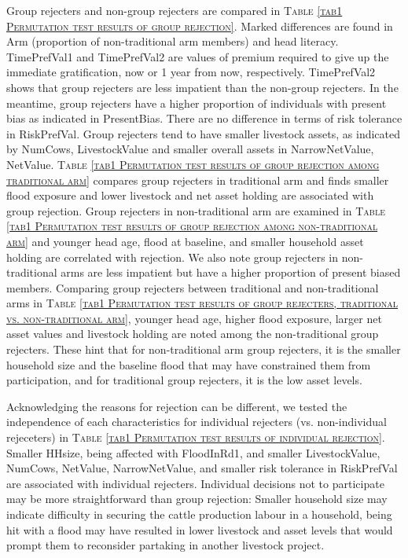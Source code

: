 	Group rejecters and non-group rejecters are compared in \textsc{\normalsize Table \ref{tab1 Permutation test results of group rejection}}. Marked differences are found in \textsf{Arm} (proportion of non-\textsf{traditional} arm members) and head literacy. \textsf{TimePrefVal1} and \textsf{TimePrefVal2} are values of premium required to give up the immediate gratification, now or 1 year from now, respectively. \textsf{TimePrefVal2} shows that group rejecters are less impatient than the non-group rejecters. In the meantime, group rejecters have a higher proportion of individuals with present bias as indicated in \textsf{PresentBias}. There are no difference in terms of risk tolerance in \textsf{RiskPrefVal}. Group rejecters tend to have smaller livestock assets, as indicated by \textsf{NumCows, LivestockValue} and smaller overall assets in \textsf{NarrowNetValue, NetValue}. 
	\textsc{\normalsize Table \ref{tab1 Permutation test results of group rejection among traditional arm}} compares group rejecters in \textsf{traditional} arm and finds smaller flood exposure and lower livestock and net asset holding are associated with group rejection. Group rejecters in non-\textsf{traditional} arm are examined in \textsc{\normalsize Table \ref{tab1 Permutation test results of group rejection among non-traditional arm}} and younger head age, flood at baseline, and smaller household asset holding are correlated with rejection. We also note group rejecters in non-\textsf{traditional} arms are less impatient but have a higher proportion of present biased members. 
	Comparing group rejecters between \textsf{traditional} and non-\textsf{traditional} arms in \textsc{\normalsize Table \ref{tab1 Permutation test results of group rejecters, traditional vs. non-traditional arm}}, younger head age, higher flood exposure, larger net asset values and livestock holding are noted among the non-\textsf{traditional} group rejecters. These hint that for non-\textsf{traditional} arm group rejecters, it is the smaller household size and the baseline flood that may have constrained them from participation, and for \textsf{traditional} group rejecters, it is the low asset levels.

	Acknowledging the reasons for rejection can be different, we tested the independence of each characteristics for individual rejecters (vs. non-individual rejeceters) in \textsc{\normalsize Table \ref{tab1 Permutation test results of individual rejection}}. Smaller \textsf{HHsize}, being affected with \textsf{FloodInRd1}, and smaller \textsf{LivestockValue}, \textsf{NumCows}, \textsf{NetValue}, \textsf{NarrowNetValue}, and smaller risk tolerance in \textsf{RiskPrefVal} are associated with individual rejecters. Individual decisions not to participate may be more straightforward than group rejection: Smaller household size may indicate difficulty in securing the cattle production labour in a household, being hit with a flood may have resulted in lower livestock and asset levels that would prompt them to reconsider partaking in another livestock project. 


